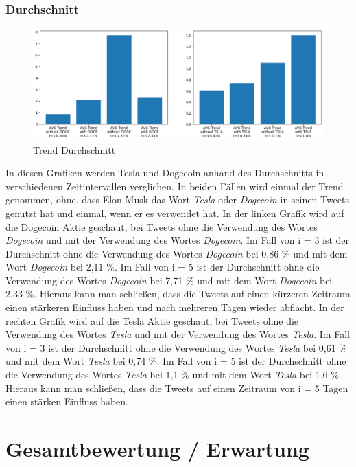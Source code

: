 \documentclass{article}
\begin{document}
\subsubsection{Durchschnitt} \label{Durchschnitt}
\begin{figure}[!htb]
  	\includegraphics[width=\textwidth, center]{../imgs/Trend_Durchschnitt.png}
 	\caption{Trend Durchschnitt}
 	\label{fig:Trend Durchschnitt}
\end{figure}
In diesen Grafiken werden Tesla und Dogecoin anhand des Durchschnitts in verschiedenen Zeitintervallen verglichen. In beiden Fällen wird einmal der Trend genommen, ohne, dass Elon Musk das Wort \textit{Tesla} oder \textit{Dogecoin} in seinen Tweets genutzt hat und einmal, wenn er es verwendet hat.
In der linken Grafik wird auf die Dogecoin Aktie geschaut, bei Tweets ohne die Verwendung des Wortes \textit{Dogecoin} und mit der Verwendung des Wortes \textit{Dogecoin}. Im Fall von i = 3 ist der Durchschnitt ohne die Verwendung des Wortes \textit{Dogecoin} bei 0,86 \% und mit dem Wort \textit{Dogecoin} bei 2,11 \%. Im Fall von i = 5 ist der Durchschnitt ohne die Verwendung des Wortes \textit{Dogecoin} bei 7,71 \% und mit dem Wort \textit{Dogecoin} bei 2,33 \%. Hieraus kann man schließen, dass die Tweets auf einen kürzeren Zeitraum einen stärkeren Einfluss haben und nach mehreren Tagen wieder abflacht.
In der rechten Grafik wird auf die Tesla Aktie geschaut, bei Tweets ohne die Verwendung des Wortes \textit{Tesla} und mit der Verwendung des Wortes \textit{Tesla}. Im Fall von i = 3 ist der Durchschnitt ohne die Verwendung des Wortes \textit{Tesla} bei 0,61 \% und mit dem Wort \textit{Tesla} bei 0,74 \%. Im Fall von i = 5 ist der Durchschnitt ohne die Verwendung des Wortes \textit{Tesla} bei 1,1 \% und mit dem Wort \textit{Tesla} bei 1,6 \%. Hieraus kann man schließen, dass die Tweets auf einen Zeitraum von i = 5 Tagen einen stärken Einfluss haben. 

\section{Gesamtbewertung / Erwartung} \label{Gesamtbewertung / Erwartung}
\end{document}
